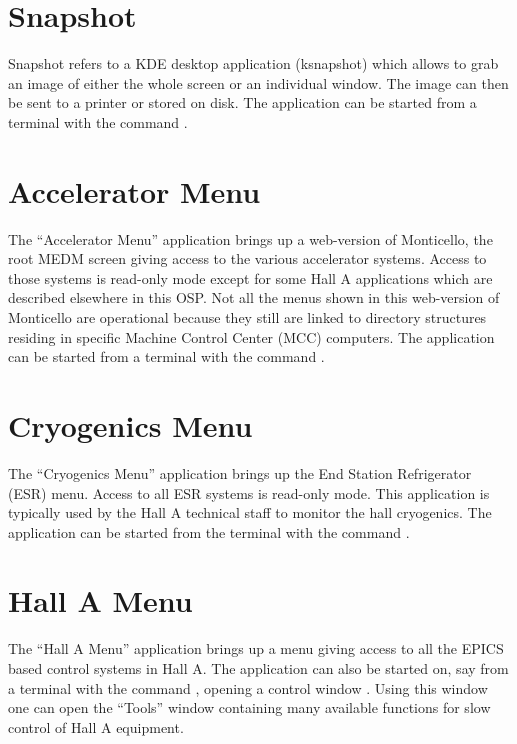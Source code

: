 {\section{Snapshot}
Snapshot refers to a KDE desktop application (ksnapshot) which allows to grab an image
of either the whole
screen or an individual window. The image can then be sent to a printer or stored on disk.
The application can be started from a terminal with the command .

\section{Accelerator Menu}
The ``Accelerator Menu'' application brings up a web-version of Monticello,
the root MEDM screen giving access to the various accelerator systems. Access to those
systems is read-only mode except for some Hall A applications which are described elsewhere
in this OSP. Not all the menus shown in this web-version of Monticello are operational
because they still are linked to directory structures residing in specific
Machine Control Center (MCC) computers. The application can be started from a terminal with
the command .

\section{Cryogenics Menu}
The ``Cryogenics Menu'' application brings up the End Station
Refrigerator (ESR) menu. Access to all ESR systems is read-only mode. This application
is typically used by the Hall A technical staff to
monitor the hall cryogenics. The application can be started from the terminal with the command .


\section{Hall A Menu}
The ``Hall A Menu'' application brings up a menu giving access to all the EPICS 
based control systems in Hall A. The application can also be started on, say 
from a terminal with the command , opening a control window%
.
Using this window one can open the ``Tools'' window%
 containing
many available functions for slow control of Hall A equipment.

}
